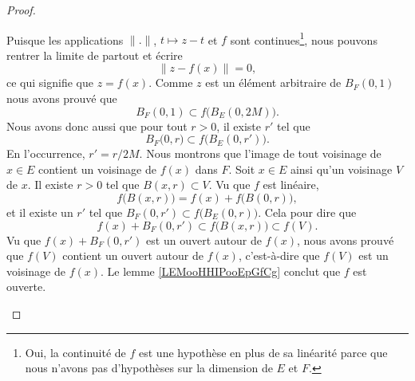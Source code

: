 \begin{proof}
\begin{subproof}
		Puisque les applications \( \| . \|\), \( t\mapsto z-t\) et \( f\) sont continues\footnote{Oui, la continuité de \( f\) est une hypothèse en plus de sa linéarité parce que nous n'avons pas d'hypothèses sur la dimension de \( E\) et \( F\).}, nous pouvons rentrer la limite de partout et écrire
		\begin{equation}
			\| z-f(x) \|=0,
		\end{equation}
		ce qui signifie que \( z=f(x)\). Comme \( z\) est un élément arbitraire de \( B_F(0,1)\) nous avons prouvé que
		\begin{equation}
			B_F(0,1)\subset f\big( B_E(0,2M) \big).
		\end{equation}
		Nous avons donc aussi que pour tout \( r>0\), il existe \( r'\) tel que
		\begin{equation}
			B_F\big( 0, r \big)\subset f\big( B_E(0,r') \big).
		\end{equation}
		En l'occurrence, \( r'=r/2M\).
		Nous montrons que l'image de tout voisinage de \( x\in E\) contient un voisinage de \( f(x)\) dans \( F\). Soit \( x\in E\) ainsi qu'un voisinage \( V\) de \( x\). Il existe \( r>0\) tel que \( B(x,r)\subset V\). Vu que \( f\) est linéaire,
		\begin{equation}
			f\big( B(x,r) \big)=f(x)+f\big( B(0,r) \big),
		\end{equation}
		et il existe un \( r'\) tel que \( B_F(0,r')\subset f\big( B_E(0,r) \big)\). Cela pour dire que
		\begin{equation}
			f(x)+B_F(0,r')\subset f\big( B(x,r) \big)\subset f(V).
		\end{equation}
		Vu que \( f(x)+B_F(0,r')\) est un ouvert autour de \( f(x)\), nous avons prouvé que \( f(V)\) contient un ouvert autour de \( f(x)\), c'est-à-dire que \( f(V)\) est un voisinage de \( f(x)\).
		\spitem[Conclusion]
		Le lemme \ref{LEMooHHIPooEpGfCg} conclut que \( f\) est ouverte.
	\end{subproof}

\end{proof}
